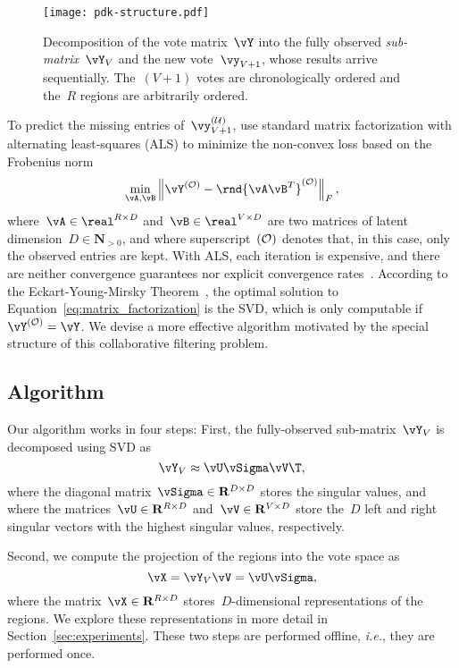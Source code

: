 \begin{figure}
	\texttt{[image: pdk-structure.pdf]}
	\caption{
		Decomposition of the vote matrix~$\vY$ into the fully observed \emph{sub-matrix}~$\vY_V$ and the new vote~$\vy_{V+1}$, whose results arrive sequentially.
		The~$(V+1)$ votes are chronologically ordered and the~$R$ regions are arbitrarily ordered.
	}
	\label{fig:structure}
\end{figure}

To predict the missing entries of~$\vy^{(\Ubs)}_{V+1}$, \citet{etter2016online} use standard matrix factorization with alternating least-squares (ALS) to minimize the non-convex loss based on the Frobenius norm
\begin{equation}
	\label{eq:matrix_factorization}
	\min_{\vA, \vB} \left\Vert \vY^{(\Obs)} - \rnd{\vA\vB^T}^{(\Obs)} \right\Vert_F,
\end{equation}
where~$\vA \in \real^{R \times D}$ and~$\vB \in \real^{V \times D}$ are two matrices of latent dimension~$D \in \mathbf{N}_{>0}$, and where superscript~$(\mathcal{O})$ denotes that, in this case, only the observed entries are kept.
With ALS, each iteration is expensive, and there are neither convergence guarantees nor explicit convergence rates~\cite{bell2007scalable, koren2009matrix}.
According to the Eckart-Young-Mirsky Theorem~\citep{eckart1936approximation}, the optimal solution to Equation~\eqref{eq:matrix_factorization} is the SVD, which is only computable if~$\vY^{(\Obs)}=\vY$.
We devise a more effective algorithm motivated by the special structure of this collaborative filtering problem\cite{etter2016online}.

\subsection{Algorithm}

Our algorithm works in four steps:
First, the fully-observed sub-matrix~$\vY_V$ is decomposed using SVD as
\begin{equation}
	\label{eq:svd}
	\vY_V \approx \vU \vSigma \vV\T,
\end{equation}
where the diagonal matrix~$\vSigma \in \mathbf{R}^{D \times D}$ stores the singular values, and where the matrices~$\vU \in \mathbf{R}^{R \times D}$ and~$\vV \in \mathbf{R}^{V \times D}$ store the~$D$ left and right singular vectors with the highest singular values, respectively.

Second, we compute the projection of the regions into the vote space as
\begin{equation}
	\label{eq:projection}
	\vX = \vY_V \vV = \vU \vSigma,
\end{equation}
where the matrix~$\vX \in \mathbf{R}^{R \times D}$ stores~$D$-dimensional representations of the regions.
We explore these representations in more detail in Section~\ref{sec:experiments}.
These two steps are performed offline, \textit{i.e.}, they are performed once.


